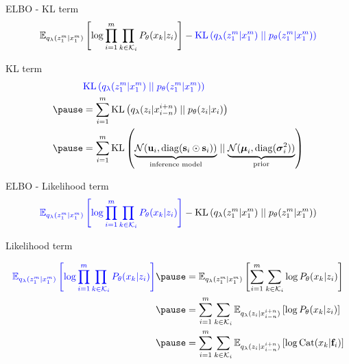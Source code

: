 \begin{frame}{ELBO - KL term}
\begin{equation*}
\begin{aligned}
\mathbb E_{q_\lambda(z_1^m|x_1^m)} \left[ \log \prod_{i=1}^m \prod_{k \in \mathcal K_i} P_\theta(x_k|z_i) \right] - \textcolor{blue}{\operatorname{KL}\left(q_\lambda(z_1^m|x_1^m)\mid\mid p_\theta(z_1^m|x_1^m)\right)}
\end{aligned}
\end{equation*}

KL term
\begin{equation*}
\begin{aligned}
&\textcolor{blue}{\KL{q_\lambda(z_1^m|x_1^m)}{p_\theta(z_1^m|x_1^m)}} \\ \pause
 &=  \sum_{i=1}^m \KL{q_\lambda(z_i|x_{i-n}^{i+n})}{p_\theta(z_i|x_i)} \\ \pause
 &=  \sum_{i=1}^m \KL{\underbrace{\mathcal N(\mathbf u_i, \diag(\mathbf s_i \odot \mathbf s_i))}_{\text{inference model}}}{\underbrace{\mathcal N(\boldsymbol \mu_i, \diag(\boldsymbol \sigma_i^2))}_{\text{prior}}} 
\end{aligned}
\end{equation*}


\end{frame}


\begin{frame}{ELBO - Likelihood term}
\begin{equation*}
\begin{aligned}
\textcolor{blue}{\mathbb E_{q_\lambda(z_1^m|x_1^m)} \left[ \log \prod_{i=1}^m \prod_{k \in \mathcal K_i} P_\theta(x_k|z_i) \right]} - \operatorname{KL}\left(q_\lambda(z_1^m|x_1^m)\mid\mid p_\theta(z_1^m|x_1^m)\right)
\end{aligned}
\end{equation*}
\pause

Likelihood term
\begin{small}
\begin{equation*}
\begin{aligned}
\textcolor{blue}{\mathbb E_{q_\lambda(z_1^m|x_1^m)} \left[ \log \prod_{i=1}^m \prod_{k \in \mathcal K_i} P_\theta(x_k|z_i) \right]}  \pause
 &= \mathbb E_{q_\lambda(z_1^m|x_1^m)} \left[  \sum_{i=1}^m \sum_{k \in \mathcal K_i} \log P_\theta(x_k|z_i) \right] \\ \pause
&= \sum_{i=1}^m \sum_{k \in \mathcal K_i} \mathbb E_{q_\lambda(z_i|x_{i-n}^{i+n})} \left[  \log P_\theta(x_k|z_i) \right] \\ \pause
&= \sum_{i=1}^m \sum_{k \in \mathcal K_i} \mathbb E_{q_\lambda(z_i|x_{i-n}^{i+n})} \left[  \log \Cat(x_k|\mathbf f_i) \right]
\end{aligned}
\end{equation*}
\end{small}

\end{frame}

